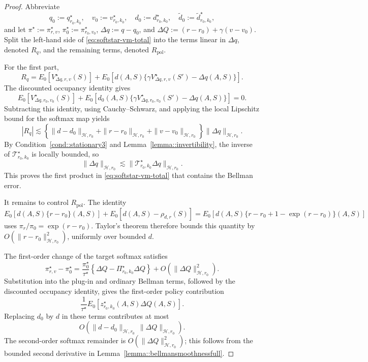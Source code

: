 \documentclass[11pt]{article}
\theoremstyle{plain}
\begin{document}
\begin{proof}
Abbreviate
\[
q_0:=q_{r_0,k_0}^\star,\quad
v_0:=v_{r_0,k_0}^\star,\quad
d_0:=d_{r_0,k_0}^\star,\quad
\widetilde d_0:=\widetilde d_{r_0,k_0}^\star,
\]
and let \(\pi^\star:=\pi_{r,v}^\star\),
\(\pi_0^\star:=\pi_{r_0,v_0}^\star\),
\(\Delta q:=q-q_0\), and
\(\Delta Q:=(r-r_0)+\gamma(v-v_0)\).
Split the left-hand side of \eqref{eq:softstar-vm-total} into the terms
linear in \(\Delta q\), denoted \(R_q\), and the remaining terms, denoted
\(R_{\mathrm{pol}}\).

For the first part,
\[
R_q
=E_0[V_{\Delta q,r,v}^\star(S)]
+E_0\!\left[d(A,S)
\{\gamma V_{\Delta q,r,v}^\star(S')-\Delta q(A,S)\}\right].
\]
The discounted occupancy identity gives
\[
E_0[V_{\Delta q,r_0,v_0}^\star(S)]
+E_0\!\left[d_0(A,S)
\{\gamma V_{\Delta q,r_0,v_0}^\star(S')-\Delta q(A,S)\}\right]=0.
\]
Subtracting this identity, using Cauchy--Schwarz, and applying the local
Lipschitz bound for the softmax map yields
\[
|R_q|
\lesssim
\left\{
\|d-d_0\|_{\mathcal H,r_0}
+\|r-r_0\|_{\mathcal H,r_0}
+\|v-v_0\|_{\mathcal H,r_0}
\right\}
\|\Delta q\|_{\mathcal H,r_0}.
\]
By Condition~\ref{cond::stationary3} and
Lemma~\ref{lemma::invertibility}, the inverse of
\(\mathcal T_{r_0,k_0}^\star\) is locally bounded, so
\[
\|\Delta q\|_{\mathcal H,r_0}
\lesssim
\|\mathcal T_{r_0,k_0}^\star\Delta q\|_{\mathcal H,r_0}.
\]
This proves the first product in \eqref{eq:softstar-vm-total} that contains the
Bellman error.

It remains to control \(R_{\mathrm{pol}}\). The identity
\[
E_0[d(A,S)\{r-r_0\}(A,S)]
+E_0[d(A,S)-\rho_{d,r}(S)]
=
E_0\!\left[d(A,S)
\{r-r_0+1-\exp(r-r_0)\}(A,S)\right]
\]
uses \(\pi_r/\pi_0=\exp(r-r_0)\). Taylor's theorem therefore bounds this
quantity by \(O(\|r-r_0\|_{\mathcal H,r_0}^2)\), uniformly over bounded
\(d\).

The first-order change of the target softmax satisfies
\[
\pi_{r,v}^\star-\pi_0^\star
=
\frac{\pi_0^\star}{\tau^\star}
\left\{\Delta Q-\Pi_{r_0,k_0}^\star\Delta Q\right\}
+O(\|\Delta Q\|_{\mathcal H,r_0}^2).
\]
Substitution into the plug-in and ordinary Bellman terms, followed by the
discounted occupancy identity, gives the first-order policy contribution
\[
\frac{1}{\tau^\star}
E_0[z_{r_0,k_0}^\star(A,S)\Delta Q(A,S)].
\]
Replacing \(d_0\) by \(d\) in these terms contributes at most
\[
O\!\left(
\|d-d_0\|_{\mathcal H,r_0}\,
\|\Delta Q\|_{\mathcal H,r_0}
\right).
\]
The second-order softmax remainder is
\(O(\|\Delta Q\|_{\mathcal H,r_0}^2)\); this follows from the bounded
second derivative in Lemma~\ref{lemma::bellmansmoothnessfull}.


\end{proof}
\end{document}
